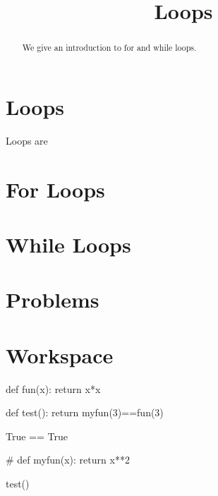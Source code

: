 \documentclass{ximera}
\title{Loops}
\begin{document}
  
\begin{abstract}  
We give an introduction to for and while loops.
\end{abstract}  
\maketitle

\section{Loops}

Loops are 

\section{For Loops}

\section{While Loops}

\section{Problems}

\begin{question}
\end{question}

\begin{question}
\end{question}

\section{Workspace}

\begin{expandable}
\begin{sageOutput}
def fun(x):
        return x*x

def test():
	return myfun(3)==fun(3)

True == True

\end{sageOutput}
\end{expandable}

\begin{sageCell}
#
def myfun(x):
        return x**2

test()
\end{sageCell}
\end{document}
